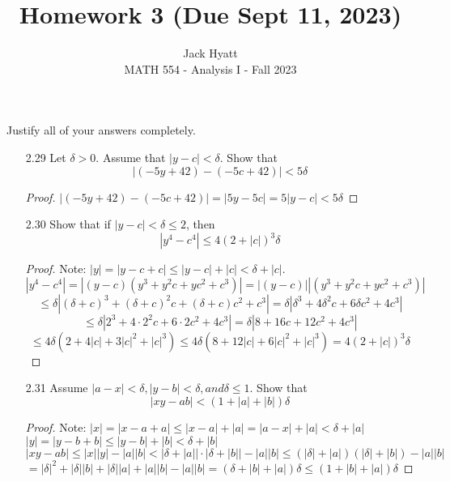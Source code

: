 \documentclass[12pt]{article}
\begin{document}
	
	
	
	\title{Homework 3 (Due Sept 11, 2023)}
	\author{Jack Hyatt\\ %
		MATH 554 - Analysis I - Fall 2023} 
	
	\maketitle
	
	Justify all of your answers completely.\\
	
	
	\medskip 
	
	\begin{enumerate}
		\item[2.29] Let $\delta > 0$. Assume that $|y-c| < \delta$. Show that \[|(-5y+42)-(-5c+42)| < 5\delta\]
		\begin{proof}
			$|(-5y+42)-(-5c+42)| = |5y-5c| = 5|y-c| < 5\delta$
		\end{proof}
		\item[2.30] Show that if $|y-c| < \delta \leq 2$, then
		\[|y^4-c^4| \leq 4(2+|c|)^3\delta\]
		\begin{proof}
			Note: $|y| = |y-c+c| \leq |y-c| + |c| < \delta + |c|$.\\
			\[|y^4-c^4| = |(y-c)(y^3+y^2c+yc^2+c^3)| = |(y-c)||(y^3+y^2c+yc^2+c^3)|\]
			\[\leq \delta |(\delta+c)^3 + (\delta+c)^2c + (\delta+c)c^2 + c^3| = \delta|\delta^3 + 4\delta^2c + 6\delta c^2 + 4c^3|\]
			\[\leq \delta|2^3 + 4\cdot2^2c + 6\cdot2c^2 + 4c^3| = \delta|8 + 16c + 12c^2 + 4c^3|\]
			\[\leq 4\delta(2 + 4|c| + 3|c|^2 + |c|^3)\leq 4\delta(8+12|c|+6|c|^2+|c|^3) = 4(2+|c|)^3\delta\]
		\end{proof}
		\item[2.31] Assume $|a-x| < \delta, |y-b|<\delta, and \delta \leq 1$. Show that
		\[|xy-ab| < (1+|a|+|b|)\delta\]
		\begin{proof}
			Note: $|x| = |x-a+a| \leq |x-a| + |a| = |a-x| + |a| < \delta + |a|$\\
			$|y| = |y-b+b| \leq |y-b| + |b| < \delta + |b|$\\
			$|xy-ab| \leq |x||y| - |a||b| < |\delta + |a||\cdot|\delta + |b||-|a||b| \leq (|\delta| + |a|)(|\delta| + |b|)-|a||b|$\\
			$= |\delta|^2 + |\delta||b| + |\delta||a| + |a||b| - |a||b| = (\delta + |b| + |a|)\delta \leq (1 + |b| + |a|)\delta$

\end{proof}
\end{enumerate}
\end{document}
